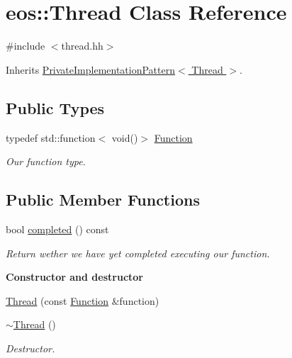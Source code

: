 \hypertarget{classeos_1_1Thread}{
\section{eos::Thread Class Reference}
\label{classeos_1_1Thread}
}


{\ttfamily \#include $<$thread.hh$>$}

Inherits \hyperlink{classeos_1_1PrivateImplementationPattern}{PrivateImplementationPattern$<$ Thread $>$}.\subsection*{Public Types}
\begin{DoxyCompactItemize}
\item 
typedef std::function$<$ void()$>$ \hyperlink{classeos_1_1Thread_a5056834a1e9dce530abf5adb90bb13ba}{Function}
\begin{DoxyCompactList}\small\item\em Our function type. \item\end{DoxyCompactList}\end{DoxyCompactItemize}
\subsection*{Public Member Functions}
\begin{DoxyCompactItemize}
\item 
bool \hyperlink{classeos_1_1Thread_a4badce4c44db821aaffa5ce06ad1f697}{completed} () const 
\begin{DoxyCompactList}\small\item\em Return wether we have yet completed executing our function. \item\end{DoxyCompactList}\end{DoxyCompactItemize}
\begin{Indent}{\bf Constructor and destructor}\par
{\em \label{_amgrpe7842d077f4197a0a949b269f1500ffe}
 }\begin{DoxyCompactItemize}
\item 
\hyperlink{classeos_1_1Thread_ad8d7a9a4d2275f21a42b80fbad67b172}{Thread} (const \hyperlink{classeos_1_1Thread_a5056834a1e9dce530abf5adb90bb13ba}{Function} \&function)
\item 
\hyperlink{classeos_1_1Thread_af56391a1c255e3cc9cf754917776af39}{$\sim$Thread} ()
\begin{DoxyCompactList}\small\item\em Destructor. \item\end{DoxyCompactList}\end{DoxyCompactItemize}
\end{Indent}


